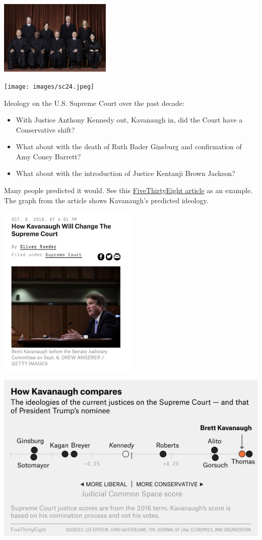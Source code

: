 \documentclass[
  letterpaper,
  DIV=11,
  numbers=noendperiod]{scrreprt}
\providecommand{\tightlist}{%
  \setlength{\itemsep}{0pt}\setlength{\parskip}{0pt}}\usepackage{longtable,booktabs,array}
\begin{document}
\includegraphics[width=0.4\textwidth,height=\textheight]{images/sccourt5.jpeg}

\texttt{[image: images/sc24.jpeg]}

Ideology on the U.S. Supreme Court over the past decade:

\begin{itemize}
\tightlist
\item
  With Justice Anthony Kennedy out, Kavanaugh in, did the Court have a
  Conservative shift?
\item
  What about with the death of Ruth Bader Ginsburg and confirmation of
  Amy Coney Barrett?
\item
  What about with the introduction of Justice Kentanji Brown Jackson?
\end{itemize}

Many people predicted it would. See this
\href{https://fivethirtyeight.com/features/how-kavanaugh-will-change-the-supreme-court/}{FiveThirtyEight
article} as an example. The graph from the article shows Kavanaugh's
predicted ideology.

\includegraphics[width=0.5\textwidth,height=\textheight]{images/kav.png}

\includegraphics{images/kavcourt.png}
\end{document}
